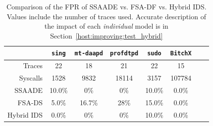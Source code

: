 \begin{table}[p]
  \centering\footnotesize
  \begin{tabular*}{\columnwidth}{@{\extracolsep{\fill}}rccccccc}

    \toprule

       & \texttt{sing} & \texttt{mt-daapd} & \texttt{profdtpd} & \texttt{sudo} & \multicolumn{1}{c}{\texttt{BitchX}}\\

    \midrule

    Traces & 22 & 18 & 21 & 22 & 15\\
    Syscalls & 1528 & 9832 & 18114 & 3157 & 107784\\
    \ac{SSAADE} & 10.0\% & 0\% & 0\% & 10.0\% & 0.0\%\\
    FSA-DS & 5.0\% & 16.7\% & 28\% & 15.0\% & 0.0\%\\
    Hybrid IDS & 0.0\% & 0\% & 0\% & 10.0\% & 0.0\%\\

    \bottomrule
  \end{tabular*}
  
  \caption{Comparison of the \ac{FPR} of \ac{SSAADE} vs. FSA-DF vs. Hybrid IDS. Values include the number of traces used. Accurate description of the impact of each \emph{individual} model is in Section~\ref{host:improving:test_hybrid}}
  \label{tab:testing2}
\end{table}

